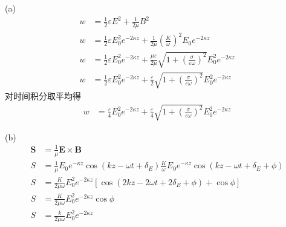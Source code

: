 (a)
\begin{align*}
    w&=\frac{1}{2}\varepsilon E^2+\frac{1}{2\mu}B^2\\
    w&=\frac{1}{2}\varepsilon E_0^2e^{-2\kappa z}+\frac{1}{2\mu}\left(\frac{K}{\omega}\right)^2E_{0}e^{-2\kappa z}\\
    w&=\frac{1}{2}\varepsilon E_0^2e^{-2\kappa z}+\frac{\mu\varepsilon}{2\mu}\sqrt{1+\left(\frac{\sigma}{\varepsilon\omega}\right)^2}E_{0}^2e^{-2\kappa z}\\
    w&=\frac{1}{2}\varepsilon E_0^2e^{-2\kappa z}+\frac{\varepsilon}{2}\sqrt{1+\left(\frac{\sigma}{\varepsilon\omega}\right)^2}E_{0}^2e^{-2\kappa z}
\end{align*}
对时间积分取平均得
\begin{align*}
w&=\frac{\varepsilon}{4} E_0^2e^{-2\kappa z}+\frac{\varepsilon}{4}\sqrt{1+\left(\frac{\sigma}{\varepsilon\omega}\right)^2}E_{0}^2e^{-2\kappa z}
\end{align*}

(b)
\begin{align*}
    \boldsymbol{S}&=\frac{1}{\mu}\boldsymbol{E}\times\boldsymbol{B}\\
    S&=\frac{1}{\mu}E_0e^{-\kappa z}\cos\left(kz-\omega t+\delta_E\right)\frac{K}{\omega}E_0e^{-\kappa z}\cos\left(kz-\omega t+\delta_E+\phi\right)\\
    S&=\frac{K}{2\mu\omega}E_0^2e^{-2\kappa z}\left[\cos(2kz-2\omega t+2\delta_E+\phi)+\cos\phi\right]\\
    S&=\frac{K}{2\mu\omega}E_0^2e^{-2\kappa z}\cos\phi\\
    S&=\frac{k}{2\mu\omega}E_0^2e^{-2\kappa z}
\end{align*}

